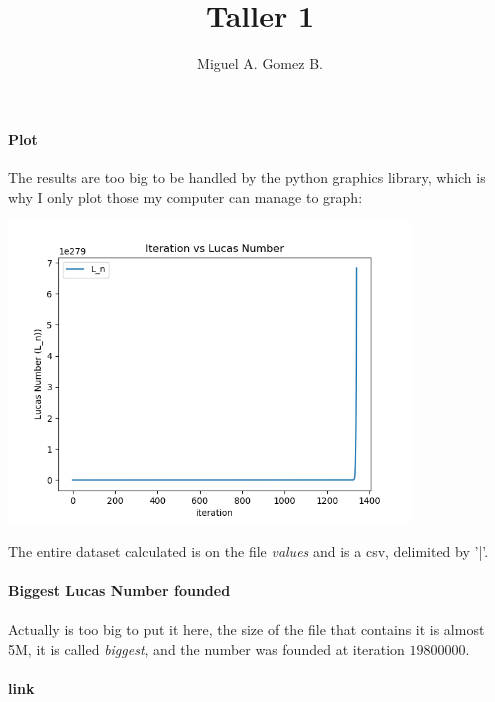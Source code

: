 \documentclass{article}
\title{Taller 1}
\author{Miguel A. Gomez B.}
\begin{document}
	\maketitle

\paragraph{Plot} The results are too big to be handled by the python graphics library, which is why I only plot those my computer can manage to graph:
\begin{center}
	\includegraphics[width=0.8\textwidth]{Plot}
\end{center}

The entire dataset calculated is on the file \textit{values} and is a csv, delimited by '|'.

\paragraph{Biggest Lucas Number founded}
\paragraph{} Actually is too big to put it here, the size of the file that contains it is almost 5M, it is called \textit{biggest}, and the number was founded at iteration $19800000$.\\

\paragraph{link}
\end{document}
